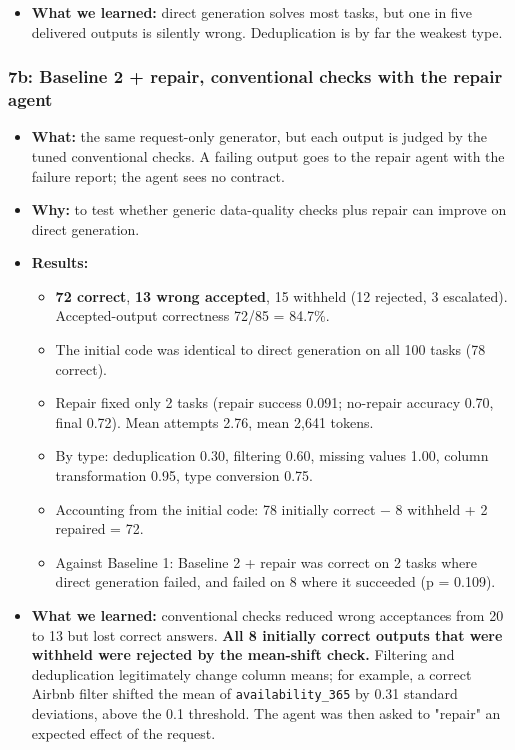 \documentclass[11pt]{article}
\providecommand{\tightlist}{\setlength{\itemsep}{0pt}\setlength{\parskip}{0pt}}
\begin{document}
\begin{itemize}
\tightlist
\item
  \textbf{What we learned:} direct generation solves most tasks, but one
  in five delivered outputs is silently wrong. Deduplication is by far
  the weakest type.
\end{itemize}

\subsubsection{7b: Baseline 2 + repair, conventional checks with the
repair agent}

\begin{itemize}
\tightlist
\item
  \textbf{What:} the same request-only generator, but each output is
  judged by the tuned conventional checks. A failing output goes to the
  repair agent with the failure report; the agent sees no contract.
\item
  \textbf{Why:} to test whether generic data-quality checks plus repair
  can improve on direct generation.
\item
  \textbf{Results:}

  \begin{itemize}
  \tightlist
  \item
    \textbf{72 correct}, \textbf{13 wrong accepted}, 15 withheld (12
    rejected, 3 escalated). Accepted-output correctness 72/85 = 84.7\%.
  \item
    The initial code was identical to direct generation on all 100 tasks
    (78 correct).
  \item
    Repair fixed only 2 tasks (repair success 0.091; no-repair accuracy
    0.70, final 0.72). Mean attempts 2.76, mean 2,641 tokens.
  \item
    By type: deduplication 0.30, filtering 0.60, missing values 1.00,
    column transformation 0.95, type conversion 0.75.
  \item
    Accounting from the initial code: 78 initially correct − 8 withheld
    + 2 repaired = 72.
  \item
    Against Baseline 1: Baseline 2 + repair was correct on 2 tasks where
    direct generation failed, and failed on 8 where it succeeded (p =
    0.109).
  \end{itemize}
\item
  \textbf{What we learned:} conventional checks reduced wrong
  acceptances from 20 to 13 but lost correct answers. \textbf{All 8
  initially correct outputs that were withheld were rejected by the
  mean-shift check.} Filtering and deduplication legitimately change
  column means; for example, a correct Airbnb filter shifted the mean of
  \texttt{availability\_\allowbreak{}365} by 0.31 standard deviations,
  above the 0.1 threshold. The agent was then asked to "repair" an
  expected effect of the request.
\end{itemize}
\end{document}
